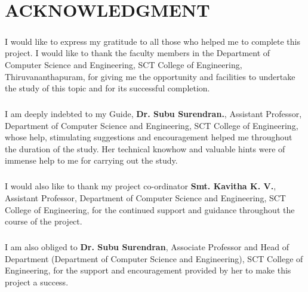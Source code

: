 \documentclass[a4paper,12pt]{report}
\begin{document}
\chapter*{\large{ACKNOWLEDGMENT}}
\paragraph{}I would like to express my gratitude to all those who helped me to complete this project. I would like to thank the faculty members in the Department of Computer Science and Engineering, SCT College of Engineering, Thiruvananthapuram, for giving me the opportunity and facilities to undertake the study of this topic and for its successful completion.
\paragraph{} I am deeply indebted to my Guide, \textbf{Dr. Subu Surendran.}, Assistant Professor, Department of Computer Science and Engineering, SCT College of Engineering, whose help, stimulating suggestions and encouragement helped me throughout the duration of the study. Her technical knowhow and valuable hints were of immense help to me for carrying out the study.
\paragraph{} I would also like to thank my project co-ordinator \textbf{Smt. Kavitha K. V.}, Assistant Professor, Department of Computer Science and Engineering, SCT College of Engineering, for the continued support and guidance throughout the course of the project.
 \paragraph{} I am also obliged to \textbf{Dr. Subu Surendran}, Associate Professor and Head of Department (Department of Computer Science and Engineering), SCT College of Engineering, for the support and encouragement provided by her to make this project a success.
\thispagestyle{empty}
\end{document}

